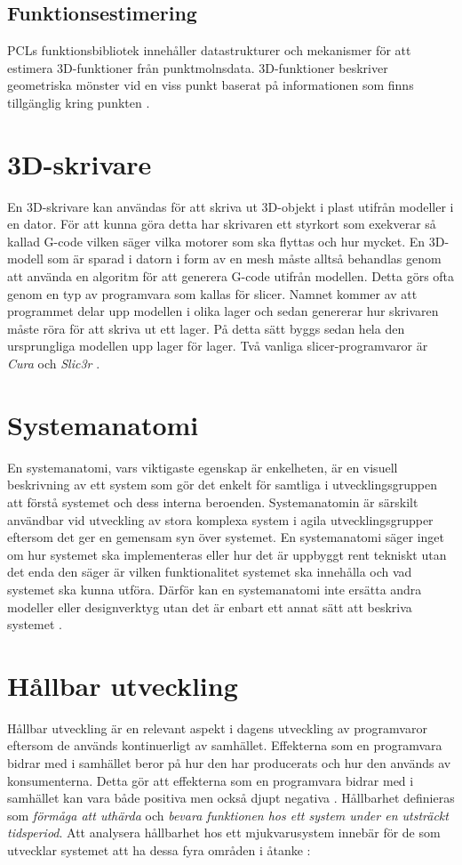 \subsection{Funktionsestimering}
PCLs funktionsbibliotek innehåller datastrukturer och mekanismer för att estimera 3D-funktioner från punktmolnsdata. 3D-funktioner beskriver geometriska mönster vid en viss punkt baserat på informationen som finns tillgänglig kring punkten \cite{pcl_feature_estimation}.

\section{3D-skrivare}
En 3D-skrivare kan användas för att skriva ut 3D-objekt i plast utifrån modeller i en dator. För att kunna göra detta har skrivaren ett styrkort som exekverar så kallad G-code \cite{gcode} vilken säger vilka motorer som ska flyttas och hur mycket. En 3D-modell som är sparad i datorn i form av en mesh måste alltså behandlas genom att använda en algoritm för att generera G-code utifrån modellen. Detta görs ofta genom en typ av programvara som kallas för slicer. Namnet kommer av att programmet delar upp modellen i olika lager och sedan genererar hur skrivaren måste röra för att skriva ut ett lager. På detta sätt byggs sedan hela den ursprungliga modellen upp lager för lager. Två vanliga slicer-programvaror är \textit{Cura} \cite{cura} och \textit{Slic3r} \cite{slic3r}.

\section{Systemanatomi}
En systemanatomi, vars viktigaste egenskap är enkelheten, är en visuell beskrivning av ett system som gör det enkelt för samtliga i utvecklingsgruppen att förstå systemet och dess interna beroenden. Systemanatomin är särskilt användbar vid utveckling av stora komplexa system i agila utvecklingsgrupper eftersom det ger en gemensam syn över systemet. En systemanatomi säger inget om hur systemet ska implementeras eller hur det är uppbyggt rent tekniskt utan det enda den säger är vilken funktionalitet systemet ska innehålla och vad systemet ska kunna utföra. Därför kan en systemanatomi inte ersätta andra modeller eller designverktyg utan det är enbart ett annat sätt att beskriva systemet \cite{system_anatomy}.


\section{Hållbar utveckling}
Hållbar utveckling är en relevant aspekt i dagens utveckling av programvaror eftersom de används kontinuerligt av samhället. Effekterna som en programvara bidrar med i samhället beror på hur den har producerats och hur den används av konsumenterna. Detta gör att effekterna som en programvara bidrar med i samhället kan vara både positiva men också djupt negativa \cite{raturi2014developing}. Hållbarhet definieras som \textit{förmåga att uthärda} och \textit{bevara funktionen hos ett system under en utsträckt tidsperiod}. Att analysera hållbarhet hos ett mjukvarusystem innebär för de som utvecklar systemet att ha dessa fyra områden i åtanke \cite{lago2015framing}:

